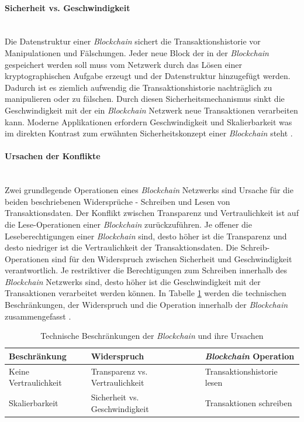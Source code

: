 \paragraph{Sicherheit vs. Geschwindigkeit}$~~$\\
Die Datenstruktur einer \textit{Blockchain} sichert die Transaktionshistorie vor Manipulationen und Fälschungen. Jeder neue Block der in der \textit{Blockchain} gespeichert werden soll muss vom Netzwerk durch das Lösen einer kryptographischen Aufgabe erzeugt und der Datenstruktur hinzugefügt werden. Dadurch ist es ziemlich aufwendig die Transaktionshistorie nachträglich zu manipulieren oder zu fälschen. Durch diesen Sicherheitsmechanismus sinkt die Geschwindigkeit mit der ein \textit{Blockchain} Netzwerk neue Transaktionen verarbeiten kann. Moderne Applikationen erfordern Geschwindigkeit und Skalierbarkeit was im direkten Kontrast zum erwähnten Sicherheitskonzept einer \textit{Blockchain} steht \citep{Drescher2017}.

\paragraph{Ursachen der Konflikte}$~~$\\
Zwei grundlegende Operationen eines \textit{Blockchain} Netzwerks sind Ursache für die beiden beschriebenen Widersprüche - Schreiben und Lesen von Transaktionsdaten. Der Konflikt zwischen Transparenz und Vertraulichkeit ist auf die Lese-Operationen einer \textit{Blockchain} zurückzuführen. Je offener die Leseberechtigungen einer \textit{Blockchain} sind, desto höher ist die Transparenz und desto niedriger ist die Vertraulichkeit der Transaktionsdaten. Die Schreib-Operationen sind für den Widerspruch zwischen Sicherheit und Geschwindigkeit verantwortlich. Je restriktiver die Berechtigungen zum Schreiben innerhalb des \textit{Blockchain} Netzwerks sind, desto höher ist die Geschwindigkeit mit der Transaktionen verarbeitet werden können. In Tabelle \ref{tab:technical-restricts-blockchain} werden die technischen Beschränkungen, der Widerspruch und die Operation innerhalb der \textit{Blockchain} zusammengefasst \citep{Drescher2017}.

\begin{table}[H]
	\begin{tabular}{@{}lll@{}}
		\toprule
		\textbf{Beschränkung} & \textbf{Widerspruch}            & \textbf{\textit{Blockchain} Operation} \\
		\midrule
		Keine Vertraulichkeit & Transparenz vs. Vertraulichkeit & Transaktionshistorie lesen    \\ \addlinespace
		Skalierbarkeit        & Sicherheit vs. Geschwindigkeit  & Transaktionen schreiben       \\
		\bottomrule
	\end{tabular}
	\caption{Technische Beschränkungen der \textit{Blockchain} und ihre Ursachen}
    \label{tab:technical-restricts-blockchain}
\end{table}

